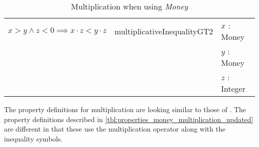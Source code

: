 \begin{table}[!ht]
\begin{tabular}{lll}
\rowcolor[HTML]{EFEFEF} $x > y \land z < 0 \implies x \cdot z < y \cdot z$ & multiplicativeInequalityGT2 & $x$ : Money              \\
\rowcolor[HTML]{EFEFEF}                                                    &                             & $y$ : Money              \\
\rowcolor[HTML]{EFEFEF}                                                    &                             & $z$ : Integer            \\ \hline
\end{tabular}
\caption{Multiplication when using \textit{Money}}
\label{tbl:properties_money_multiplication_updated}
\end{table}
\FloatBarrier\noindent
The property definitions for multiplication are looking similar to those of
. The property definitions described
in \autoref{tbl:properties_money_multiplication_updated} are different in that
these use the multiplication operator along with the inequality symbols.


